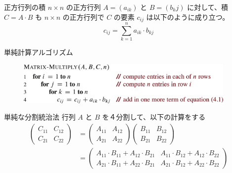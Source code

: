 \documentclass[unicode,11pt,aspectratio=169,notes]{beamer} %
\begin{document}

\begin{frame}{正方行列の積}
  $n\times n$ の正方行列 $A=(a_{ik})$ と $B=(b_kj)$ に対して、積 $C=A\cdot B$ も
  $n\times n$ の正方行列で $C$ の要素 $c_{ij}$ は以下のように成り立つ。
  \[
    c_{ij} = \sum_{k=1}^na_{ik}\cdot b_{kj}
  \]
\end{frame}

\begin{frame}{単純計算アルゴリズム}
  \begin{figure}
    \includegraphics[width=0.95\textwidth]{../resources/pseudo-04-01}
  \end{figure}
\end{frame}


\begin{frame}{単純な分割統治法}
  行列 $A$ と $B$ を４分割して、以下の計算をする
  \begin{align*}
    \begin{pmatrix}
      C_{11} & C_{12} \\
      C_{21} & C_{22}
    \end{pmatrix}
    & =
    \begin{pmatrix}
      A_{11} & A_{12} \\
      A_{21} & A_{22}
    \end{pmatrix}
    \begin{pmatrix}
      B_{11} & B_{12} \\
      B_{21} & B_{22}
    \end{pmatrix} \\
    & =
    \begin{pmatrix}
      A_{11} \cdot B_{11} + A_{12} \cdot B_{21} &
      A_{11} \cdot B_{12} + A_{12} \cdot B_{22} \\
      A_{21} \cdot B_{11} + A_{22} \cdot B_{21} &
      A_{21} \cdot B_{12} + A_{22} \cdot B_{22} 
    \end{pmatrix}
  \end{align*}
\end{frame}
\end{document}
